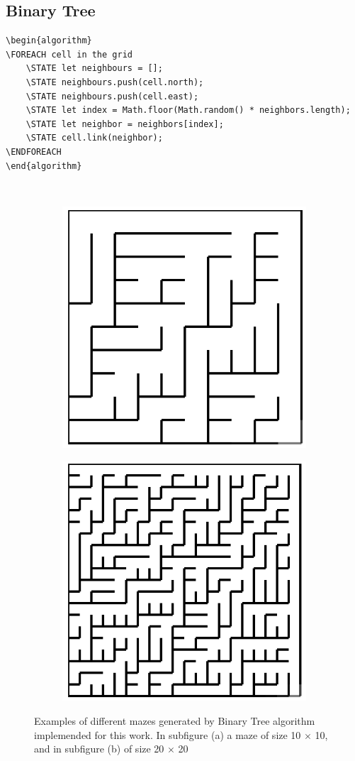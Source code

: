 \subsection{Binary Tree}
\newline
\begin{lstlisting}[caption={Pseudocode for a Binary Tree Algorithm}]
\begin{algorithm}
\FOREACH cell in the grid
	\STATE let neighbours = [];
	\STATE neighbours.push(cell.north);
	\STATE neighbours.push(cell.east);
	\STATE let index = Math.floor(Math.random() * neighbors.length);
	\STATE let neighbor = neighbors[index];
	\STATE cell.link(neighbor);
\ENDFOREACH	
\end{algorithm}
\end{lstlisting}
\\
\newline
\begin{figure}[!h]
	\centering
	\begin{subfigure}{.45\textwidth}
	  \centering
	  \includegraphics[width=.6\linewidth]{binary1010}
	  \caption{}
	  \label{fig:sub1}
	\end{subfigure}
	\begin{subfigure}{.45\textwidth}
	  \centering
	  \includegraphics[width=.6\linewidth]{binary2020}
	  \caption{}
	  \label{fig:sub2}
	\end{subfigure}
	\caption{Examples of different mazes generated by Binary Tree algorithm implemended for this work. In subfigure (a) a maze of size 10 $\times$ 10, and in subfigure (b) of size 20 $\times$ 20}
	\label{fig:test}
	\end{figure}


